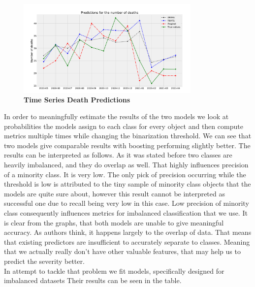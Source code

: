 \begin{figure}[htpb!]
	\centering
	\includegraphics[width=0.8\textwidth]{../imgs/pdf_files/ts_predictions.pdf}
	\caption{\textbf{Time Series Death Predictions}}
	\label{fig:ts_predictions}
\end{figure}
\noindent
In order to meaningfully estimate the results of the two models we look at probabilities the models assign to each class
for every object and then compute metrics multiple times while changing the binarization threshold.
We can see that two models give comparable results with boosting performing slightly better. The results can be interpreted as follows.
As it was stated before two classes are heavily imbalanced, and they do overlap as well.
That highly influences precision of a minority class. It is very low.
The only pick of precision occurring while the threshold is low is attributed to the tiny sample of minority class objects
that the models are quite sure about, however this result cannot be interpreted as successful one due to recall being very low in this case. 
Low precision of minority class consequently influences metrics for imbalanced classification that we use. 
It is clear from the graphs, that both models are unable to give meaningful accuracy.
As authors think, it happens largely to the overlap of data.
That means that existing predictors are insufficient to accurately separate to classes.
Meaning that we actually really don’t have other valuable features, that may help us to predict the severity better. \\
In attempt to tackle that problem we fit models, specifically designed for imbalanced datasets 
Their results can be seen in the table.

